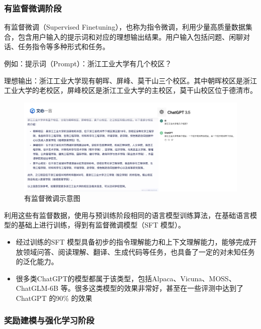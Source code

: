 \documentclass{article} %
\begin{document}
\subsubsection{有监督微调阶段}    
有监督微调（Supervised Finetuning），也称为指令微调，利用少量高质量数据集合，包含用户输入的提示词和对应的理想输出结果。用户输入包括问题、闲聊对话、任务指令等多种形式和任务。
\begin{tcolorbox}
    例如：提示词（Prompt）：浙江工业大学有几个校区？
    
    理想输出：浙江工业大学现有朝晖、屏峰、莫干山三个校区。其中朝晖校区是浙江工业大学的老校区，屏峰校区是浙江工业大学的主校区，莫干山校区位于德清市。
\end{tcolorbox}
\begin{figure}[h] %
    \centering %
    \includegraphics[width=\textwidth]{有监督微调示意图.png} %
    \caption{有监督微调示意图} %
    \label{fig:example} %
\end{figure}
\FloatBarrier

利用这些有监督数据，使用与预训练阶段相同的语言模型训练算法，在基础语言模型的基础上进行训练，得到有监督微调模型（SFT 模型）。

\begin{itemize}
    \item 经过训练的SFT 模型具备初步的指令理解能力和上下文理解能力，能够完成开放领域问答、阅读理解、翻译、生成代码等任务，也具备了一定的对未知任务的泛化能力。
    \item 很多类ChatGPT的模型都属于该类型，包括Alpaca、Vicuna、MOSS、ChatGLM-6B 等。很多这类模型的效果非常好，甚至在一些评测中达到了ChatGPT 的90\% 的效果
\end{itemize}

\subsubsection{奖励建模与强化学习阶段}    
\end{document}
